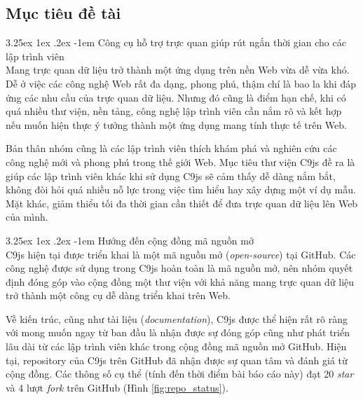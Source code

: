 \documentclass[12pt,a4paper]{article}
\makeatletter
\newcommand{\myparagraph}[1]{\paragraph{#1}\mbox{}\\} %
\renewcommand\paragraph{\@startsection{paragraph}{5}{\z@}%
  {3.25ex \@plus1ex \@minus.2ex}%
  {-1em}%
  {\normalfont\normalsize\bfseries}}
\makeatother
\begin{document}
\subsection{Mục tiêu đề tài}
\myparagraph{Công cụ hỗ trợ trực quan giúp rút ngắn thời gian cho các lập trình viên}
Mang trực quan dữ liệu trở thành một ứng dụng trên nền Web vừa dễ vừa khó. Dễ ở việc các công nghệ Web rất đa dạng, phong phú, thậm chí là bao la khi đáp ứng các nhu cầu của trực quan dữ liệu. Nhưng đó cũng là điểm hạn chế, khi có quá nhiều thư viện, nền tảng, công nghệ lập trình viên cần nắm rõ và kết hợp nếu muốn hiện thực ý tưởng thành một ứng dụng mang tính thực tế trên Web.

Bản thân nhóm cũng là các lập trình viên thích khám phá và nghiên cứu các công nghệ mới và phong phú trong thế giới Web. Mục tiêu thư viện C9js đề ra là giúp các lập trình viên khác khi sử dụng C9js sẽ cảm thấy dễ dàng nắm bắt, không đòi hỏi quá nhiều nỗ lực trong việc tìm hiểu hay xây dựng một ví dụ mẫu. Mặt khác, giảm thiểu tối đa thời gian cần thiết để đưa trực quan dữ liệu lên Web của mình.

\myparagraph{Hướng đến cộng đồng mã nguồn mở}
C9js hiện tại được triển khai là một mã nguồn mở (\textit{open-source}) tại GitHub\cite{c9js_github}. Các công nghệ được sử dụng trong C9js hoàn toàn là mã nguồn mở, nên nhóm quyết định đóng góp vào cộng đồng một thư viện với khả năng mang trực quan dữ liệu trở thành một công cụ dễ dàng triển khai trên Web. 

Về kiến trúc, cũng như tài liệu (\textit{documentation}), C9js được thể hiện rất rõ ràng với mong muốn ngay từ ban đầu là nhận được sự đóng góp cũng như phát triển lâu dài từ các lập trình viên khác trong cộng đồng mã nguồn mở GitHub. Hiện tại, repository\cite{c9js_repo} của C9js trên GitHub đã nhận được sự quan tâm và đánh giá từ cộng đồng. Các thông số cụ thể (tính đến thời điểm bài báo cáo này) đạt 20 \textit{star} và 4 lượt \textit{fork} trên GitHub (Hình \ref{fig:repo_status}).

\end{document}
